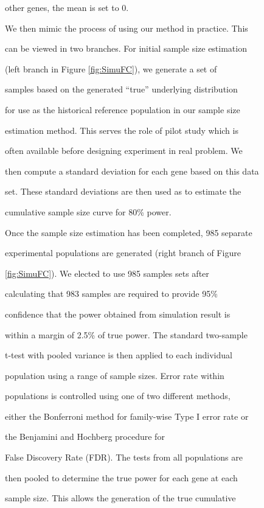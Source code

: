 \documentclass[12pt]{article}
\begin{document}
other genes, the mean is set to $0$.



We then mimic the process of using our method in practice. This

can be viewed in two branches. For initial sample size estimation

(left branch in Figure \ref{fig:SimuFC}), we generate a set of

samples based on the generated ``true'' underlying distribution

for use as the historical reference population in our sample size

estimation method.  This serves the role of pilot study which is

often available before designing experiment in real problem.  We

then compute a standard deviation for each gene based on this data

set.  These standard deviations are then used as to estimate the

cumulative sample size curve for 80\% power.



Once the sample size estimation has been completed, 985 separate

experimental populations are generated (right branch of Figure

\ref{fig:SimuFC}).  We elected to use 985 samples sets after

calculating that 983 samples are required to provide 95\%

confidence that the power obtained from simulation result is

within a margin of 2.5\% of true power.  The standard two-sample

t-test with pooled variance is then applied to each individual

population using a range of sample sizes.  Error rate within

populations is controlled using one of two different methods,

either the Bonferroni method for family-wise Type I error rate or

the Benjamini and Hochberg procedure \citeyearpar{Benjamini95} for

False Discovery Rate (FDR). The tests from all populations are

then pooled to determine the true power for each gene at each

sample size. This allows the generation of the true cumulative
\end{document}
